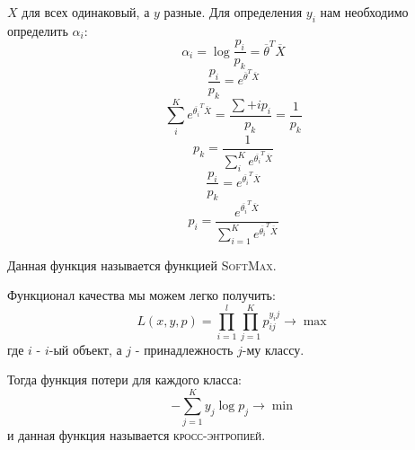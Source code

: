 \documentclass[%
10pt, %
final, %
oneside, %
onecolumn, %
centertags]{article} %
\theoremstyle{plain}
\theoremstyle{definition}
\theoremstyle{remark}
\begin{document}
$X$ для всех одинаковый, а $y$ разные. Для определения $y_i$ нам необходимо определить $\alpha_i$:
$$\alpha_i = \log \frac{p_i}{p_k} = \overline{\theta}^T \overline{X}$$
$$\frac{p_i}{p_k} = e^{\overline{\theta}^T \overline{X}}$$
$$\sum\limits_i^K e^{\overline{\theta_i}^T \overline{X}} = \frac{\sum\limits+i p_i}{p_k} = \frac{1}{p_k}$$
$$p_k= \frac{1}{\sum\limits_i^K e^{\overline{\theta_i}^T \overline{X}}}$$
$$\frac{p_i}{p_k} = e^{\overline{\theta_i}^T \overline{X}}$$
$$p_i = \frac{e^{\overline{\theta_i}^T \overline{X}}}{\sum\limits_{i=1}^K e^{\overline{\theta_i}^T \overline{X}}}$$

Данная функция называется функцией \textsc{SoftMax}.

Функционал качества мы можем легко получить:
$$L(x,y,p) = \prod\limits_{i=1}^l \prod\limits_{j=1}^K p_{ij}^{y_ij} \to \max$$
где $i$ - $i$-ый объект, а $j$ - принадлежность $j$-му классу.

Тогда функция потери для каждого класса:
$$-\sum\limits_{j=1}^K y_j \log p_j \to \min$$
и данная функция называется \textsc{кросс-энтропией}.
\end{document}
